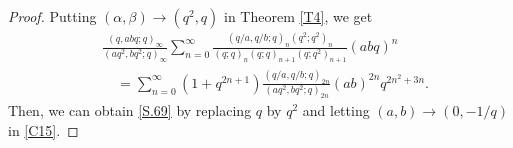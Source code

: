 \documentclass[reqno,12pt]{amsart}
\theoremstyle{remark}
\numberwithin{equation}{section}
\begin{document}
\begin{proof}

Putting $\left(\alpha,\beta\right)\to\left(q^2,q\right)$ in Theorem \ref{T4}, we get
\begin{align}
&\frac{\left(q,abq;q\right)_{\infty}}{\left(aq^2,bq^2;q\right)_{\infty}}
\sum_{n=0}^{\infty}\frac{\left(q/a,q/b;q\right)_n\left(q^2;q^2\right)_n}
{\left(q;q\right)_n\left(q;q\right)_{n+1}\left(q;q^2\right)_{n+1}}\left(abq\right)^n\nonumber\\
&\quad=\sum_{n=0}^{\infty}\left(1+q^{2n+1}\right)\frac{\left(q/a,q/b;q\right)_{2n}}{\left(aq^2,bq^2;q\right)_{2n}}
\left(ab\right)^{2n}q^{2n^2+3n}.\label{C15}
\end{align}
Then, we  can obtain \eqref{S.69} by replacing $q$ by $q^2$ and letting $\left(a,b\right)\to\left(0,-1/q\right)$ in \eqref{C15}.

\end{proof}
\end{document}
